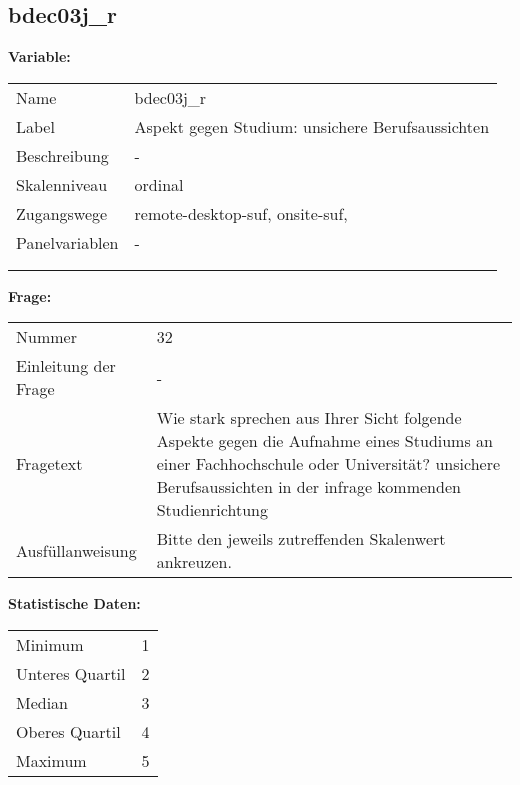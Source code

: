 	
	
	\subsection{bdec03j\_r}
	\label{subSection:bdec03j_r}

	\noindent\textbf{Variable:}\\
		\begin{tabular}{lL{11.3cm}}
			\label{tableVariable:bdec03j_r}
			Name & bdec03j\_r \\
			Label & Aspekt gegen Studium: unsichere Berufsaussichten \\
			Beschreibung & - \\
			Skalenniveau & ordinal \\
			Zugangswege &
				remote-desktop-suf,
				onsite-suf,
 \\
			Panelvariablen & -
			 \\
			 \\
 \\
		\end{tabular}

		\vspace*{1 cm}
		\noindent\textbf{Frage:}\\
		\begin{tabular}{lL{11.3cm}}
			\label{tableQuestion:bdec03j_r}
			Nummer & 32 \\
			Einleitung der Frage & - \\
			Fragetext & Wie stark sprechen aus Ihrer Sicht folgende Aspekte gegen die Aufnahme eines Studiums an einer Fachhochschule oder Universität?
unsichere Berufsaussichten in der infrage kommenden Studienrichtung \\
			Ausfüllanweisung & Bitte den jeweils zutreffenden Skalenwert ankreuzen. \\
		\end{tabular}


		\vspace*{1 cm}
		\noindent\textbf{Statistische Daten:}\\
			\begin{tabular}{ll}
				\label{tableStatistics:bdec03j_r}
					Minimum & 1 \\
					Unteres Quartil & 2 \\
					Median & 3 \\
					Oberes Quartil & 4 \\
					Maximum & 5 \\
			\end{tabular}



